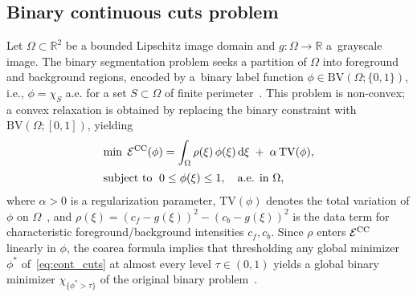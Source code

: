 \documentclass[11pt,reqno]{amsart}
\theoremstyle{plain}
\newcommand\R{\mathbb R}
\def\drm{\text{d}}
\newcommand\calE{\mathcal E}
\newcommand{\CC}{{\rm CC}}
\begin{document}
		\subsection{Binary continuous cuts problem}
		\label{sec:Binary-CC}
		
		Let $\Omega \subset \mathbb{R}^2$ be a bounded Lipschitz image domain and $g : \Omega \to \R$ a~grayscale image. The binary segmentation problem seeks a partition of $\Omega$ into foreground and background regions, encoded by a~binary label function $\phi\in \mathrm{BV}(\Omega;\{0,1\})$, i.e., $\phi=\chi_S$ a.e.
		for a set $S\subset\Omega$ of finite perimeter~\cite{AmbrosioFuscoPallara2000}. This problem is non-convex; a convex relaxation is obtained by replacing the binary 
		constraint with $\mathrm{BV}(\Omega;{[0,1]})$, yielding
		\begin{equation}\label{eq:cont_cuts}
			\begin{array}{l}
				\displaystyle{\min \;\calE^{\CC}(\phi) = \int_{\Omega} \rho(\xi)\,\phi(\xi)\,\drm\xi
					\;+\;
					\alpha \, \mathrm{TV}(\phi),}
				\\[4mm]
				\text{subject to } \; 0 \leq \phi(\xi) \leq 1, \quad \text{a.e. in } \Omega,
			\end{array}
		\end{equation}
		where $\alpha > 0$ is a regularization parameter, $\mathrm{TV}(\phi)$ denotes the total variation of $\phi$ on $\Omega$~\cite{AmbrosioFuscoPallara2000}, and 
		$\rho(\xi) = (c_f - g(\xi))^2 - (c_b - g(\xi))^2$ is the data term for characteristic foreground/background intensities $c_f,c_b$.
		Since $\rho$ enters $\calE^{\CC}$ linearly in $\phi$, the coarea formula implies that thresholding any global minimizer~$\phi^\ast$ of~\eqref{eq:cont_cuts}
		at almost every level 
		$\tau\in(0,1)$ yields a global binary minimizer 
		$\chi_{\{\phi^\ast>\tau\}}$ of the original binary problem~\cite{ChanEsedogluNikolova2006}. 
		
\end{document}
